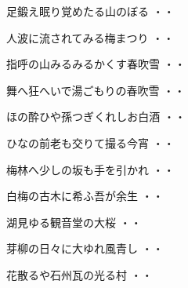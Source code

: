 \vspace{0.6cm}
\begin{shiika}足鍛え眠り覚めたる山のぼる
\hfill{・・}\end{shiika}
\vspace{0.6cm}
\begin{shiika}人波に流されてみる梅まつり
\hfill{・・}\end{shiika}
\vspace{0.6cm}
\begin{shiika}指呼の山みるみるかくす春吹雪
\hfill{・・}\end{shiika}
\vspace{0.6cm}
\begin{shiika}舞へ狂へいで湯ごもりの春吹雪
\hfill{・・}\end{shiika}
\vspace{0.6cm}
\begin{shiika}ほの酔ひや孫つぎくれしお白酒
\hfill{・・}\end{shiika}
\vspace{0.6cm}
\begin{shiika}ひなの前老も交りて撮る今宵
\hfill{・・}\end{shiika}
\vspace{0.6cm}
\begin{shiika}梅林へ少しの坂も手を引かれ
\hfill{・・}\end{shiika}
\vspace{0.6cm}
\begin{shiika}白梅の古木に希ふ吾が余生
\hfill{・・}\end{shiika}
\vspace{0.6cm}
\begin{shiika}湖見ゆる観音堂の大桜
\hfill{・・}\end{shiika}
\vspace{0.6cm}
\begin{shiika}芽柳の日々に大ゆれ風青し
\hfill{・・}\end{shiika}
\vspace{0.6cm}
\begin{shiika}花散るや石州瓦の光る村
\hfill{・・}\end{shiika}
\vspace{0.6cm}
